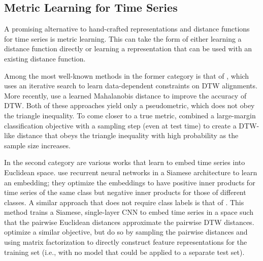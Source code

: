 \subsection{Metric Learning for Time Series}

A promising alternative to hand-crafted representations and distance functions for time series is metric learning. This can take the form of either learning a distance function directly or learning a representation that can be used with an existing distance function.

Among the most well-known methods in the former category is that of \citep{dtwLearnedConstraints}, which uses an iterative search to learn data-dependent constraints on DTW alignments. More recently, \citet{mddtw} use a learned Mahalanobis distance to improve the accuracy of DTW. Both of these approaches yield only a pseudometric, which does not obey the triangle inequality. To come closer to a true metric, \citet{decade} combined a large-margin classification objective with a sampling step (even at test time) to create a DTW-like distance that obeys the triangle inequality with high probability as the sample size increases.

In the second category are various works that learn to embed time series into Euclidean space. \citet{siameseRecurrent} use recurrent neural networks in a Siamese architecture \citep{siameseOrig} to learn an embedding; they optimize the embeddings to have positive inner products for time series of the same class but negative inner products for those of different classes. A similar approach that does not require class labels is that of \citet{ldps}. This method trains a Siamese, single-layer CNN to embed time series in a space such that the pairwise Euclidean distances approximate the pairwise DTW distances. \citet{spiral} optimize a similar objective, but do so by sampling the pairwise distances and using matrix factorization to directly construct feature representations for the training set (i.e., with no model that could be applied to a separate test set).

